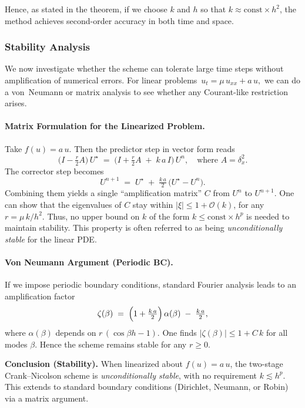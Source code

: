 Hence, as stated in the theorem, if we choose \(k\) and \(h\) so that \(k \approx \mathrm{const}\times h^2\),
the method achieves second-order accuracy in both time and space.

\subsubsection{Stability Analysis}

We now investigate whether the scheme can tolerate large time steps without amplification
of numerical errors. For linear problems
\(\,u_t = \mu\,u_{xx} + a\,u,\) we can do a von~Neumann or matrix analysis to see whether
any Courant-like restriction arises.

\paragraph{Matrix Formulation for the Linearized Problem.}
Take \(f(u) = a\,u\). Then the predictor step in vector form reads
\[
  \bigl(I - \tfrac{r}{2}A\bigr)\,U^\star
  \;=\;
  \bigl(I + \tfrac{r}{2}A \;+\; k\,a\,I \bigr)\,U^n,
  \quad\text{where }A = \delta_x^2.
\]
The corrector step becomes
\[
  U^{n+1}
  \;=\;
  U^\star \;+\;\tfrac{k\,a}{2}\,\bigl(U^\star - U^n\bigr).
\]
Combining them yields a single ``amplification matrix'' \(C\) from \(U^n\) to \(U^{n+1}\).
One can show that the eigenvalues of \(C\) stay within \(\lvert\xi\rvert \le 1 + \mathcal{O}(k)\),
for any \(r = \mu\,k/h^2\). Thus, no upper bound on \(k\) of the form \(k\le \mathrm{const}\times h^p\)
is needed to maintain stability. This property is often referred to as being
\emph{unconditionally stable} for the linear PDE.

\paragraph{Von Neumann Argument (Periodic BC).}
If we impose periodic boundary conditions, standard Fourier analysis leads to an
amplification factor
\[
  \zeta(\beta) \;=\;
  \Bigl(1 + \tfrac{k\,a}{2}\Bigr)\,\alpha(\beta) 
  \;-\;
  \tfrac{k\,a}{2},
\]
where \(\alpha(\beta)\) depends on \(r\,(\cos\beta h - 1)\). One finds
\(\bigl|\zeta(\beta)\bigr| \le 1 + C\,k\) for all modes \(\beta\). Hence the scheme remains
stable for any \(r\ge0\).

\medskip
\noindent
\textbf{Conclusion (Stability).} When linearized about \(f(u)=a\,u\), the two-stage
Crank–Nicolson scheme is \emph{unconditionally stable}, with no requirement
\(k\lesssim h^p\). This extends to standard boundary conditions (Dirichlet, Neumann, or
Robin) via a matrix argument.

